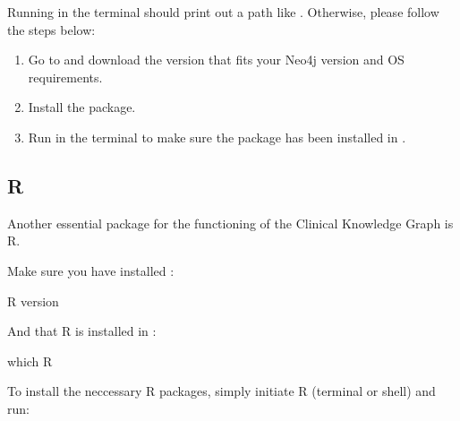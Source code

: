 \documentclass[letterpaper,10pt,english]{sphinxmanual}
\begin{document}
Running  in the terminal should print out a path like . Otherwise, please follow the steps below:
\begin{enumerate}
%
\item {} 
Go to  and download the version that fits your Neo4j version and OS requirements.

\item {} 
Install the package.

\item {} 
Run  in the terminal to make sure the  package has been installed in .

\end{enumerate}


\subsection{R}
\label{\detokenize{intro/getting-started-with-requirements:r}}
Another essential package for the functioning of the Clinical Knowledge Graph is R.

Make sure you have installed :

\begin{sphinxVerbatim}[commandchars=\\\{\}]
\PYGZdl{} R \PYGZhy{}\PYGZhy{}version
\end{sphinxVerbatim}

And that R is installed in :

\begin{sphinxVerbatim}[commandchars=\\\{\}]
\PYGZdl{} which R
\end{sphinxVerbatim}

To install the neccessary R packages, simply initiate R (terminal or shell) and run:
\end{document}
